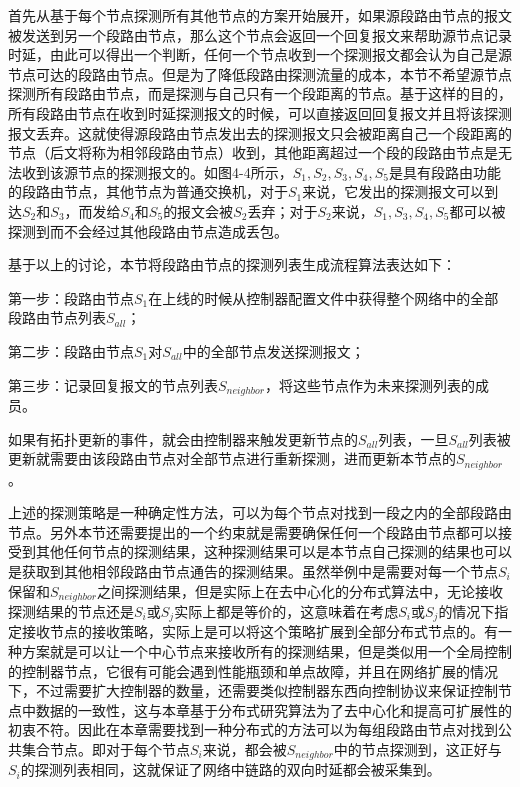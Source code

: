 首先从基于每个节点探测所有其他节点的方案开始展开，如果源段路由节点的报文被发送到另一个段路由节点，那么这个节点会返回一个回复报文来帮助源节点记录时延，由此可以得出一个判断，任何一个节点收到一个探测报文都会认为自己是源节点可达的段路由节点。但是为了降低段路由探测流量的成本，本节不希望源节点探测所有段路由节点，而是探测与自己只有一个段距离的节点。基于这样的目的，所有段路由节点在收到时延探测报文的时候，可以直接返回回复报文并且将该探测报文丢弃。这就使得源段路由节点发出去的探测报文只会被距离自己一个段距离的节点（后文将称为相邻段路由节点）收到，其他距离超过一个段的段路由节点是无法收到该源节点的探测报文的。如图4-4所示，${S_1, S_2, S_3, S_4, S_5}$是具有段路由功能的段路由节点，其他节点为普通交换机，对于$S_1$来说，它发出的探测报文可以到达$S_2$和$S_3$，而发给$S_4$和$S_5$的报文会被$S_2$丢弃；对于$S_2$来说，$S_1, S_3, S_4, S_5$都可以被探测到而不会经过其他段路由节点造成丢包。

基于以上的讨论，本节将段路由节点的探测列表生成流程算法表达如下：

第一步：段路由节点$S_1$在上线的时候从控制器配置文件中获得整个网络中的全部段路由节点列表$S_{all}$；

第二步：段路由节点$S_1$对$S_{all}$中的全部节点发送探测报文；

第三步：记录回复报文的节点列表$S_{neighbor}$，将这些节点作为未来探测列表的成员。

如果有拓扑更新的事件，就会由控制器来触发更新节点的$S_{all}$列表，一旦$S_{all}$列表被更新就需要由该段路由节点对全部节点进行重新探测，进而更新本节点的$S_{neighbor}$。

上述的探测策略是一种确定性方法，可以为每个节点对找到一段之内的全部段路由节点。另外本节还需要提出的一个约束就是需要确保任何一个段路由节点都可以接受到其他任何节点的探测结果，这种探测结果可以是本节点自己探测的结果也可以是获取到其他相邻段路由节点通告的探测结果。虽然举例中是需要对每一个节点$S_i$保留和$S_{neighbor}$之间探测结果，但是实际上在去中心化的分布式算法中，无论接收探测结果的节点还是$S_i$或$S_j$实际上都是等价的，这意味着在考虑$S_i$或$S_j$的情况下指定接收节点的接收策略，实际上是可以将这个策略扩展到全部分布式节点的。有一种方案就是可以让一个中心节点来接收所有的探测结果，但是类似用一个全局控制的控制器节点，它很有可能会遇到性能瓶颈和单点故障，并且在网络扩展的情况下，不过需要扩大控制器的数量，还需要类似控制器东西向控制协议来保证控制节点中数据的一致性，这与本章基于分布式研究算法为了去中心化和提高可扩展性的初衷不符。因此在本章需要找到一种分布式的方法可以为每组段路由节点对找到公共集合节点。即对于每个节点$S_i$来说，都会被$S_{neighbor}$中的节点探测到，这正好与$S_i$的探测列表相同，这就保证了网络中链路的双向时延都会被采集到。

